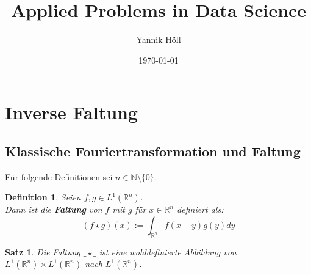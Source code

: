 \documentclass{article}
\title{Applied Problems in Data Science}
\author{Yannik Höll}
\date{\today}
\newcommand{\R}[0]{\mathbb{R}}
\newtheorem{defin}{Definition}
\newtheorem{thm}{Satz}
\begin{document}
\nocite{*}

\maketitle

\section{Inverse Faltung}

\subsection{Klassische Fouriertransformation und Faltung}

Für folgende Definitionen sei $n \in \mathbb{N} \setminus \{ 0 \}$.

\begin{defin}
    Seien $f,g \in L^1(\R^n)$. \\
    Dann ist die \textbf{Faltung} von $f$ mit $g$ für $x \in \R^n$ definiert als:
    \begin{equation}
        (f \star g)(x) := \int_{\R^n} f(x - y) g(y) dy
    \end{equation}
\end{defin}

\begin{thm}\label{thm:konvmap}
    Die Faltung $\_ \star \_$ ist eine wohldefinierte Abbildung von $L^1(\R^n) \times L^1(\R^n)$ nach $L^1(\R^n)$.
\end{thm}
\end{document}
